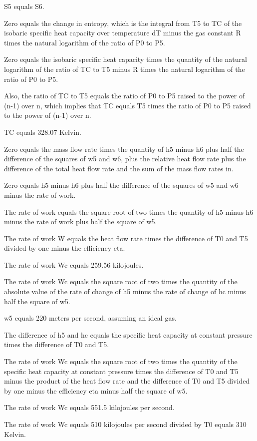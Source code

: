 S5 equals S6.

Zero equals the change in entropy, which is the integral from T5 to TC of the isobaric specific heat capacity over temperature dT minus the gas constant R times the natural logarithm of the ratio of P0 to P5.

Zero equals the isobaric specific heat capacity times the quantity of the natural logarithm of the ratio of TC to T5 minus R times the natural logarithm of the ratio of P0 to P5.

Also, the ratio of TC to T5 equals the ratio of P0 to P5 raised to the power of (n-1) over n, which implies that TC equals T5 times the ratio of P0 to P5 raised to the power of (n-1) over n.

TC equals 328.07 Kelvin.

Zero equals the mass flow rate times the quantity of h5 minus h6 plus half the difference of the squares of w5 and w6, plus the relative heat flow rate plus the difference of the total heat flow rate and the sum of the mass flow rates in.

Zero equals h5 minus h6 plus half the difference of the squares of w5 and w6 minus the rate of work.

The rate of work equals the square root of two times the quantity of h5 minus h6 minus the rate of work plus half the square of w5.

The rate of work W equals the heat flow rate times the difference of T0 and T5 divided by one minus the efficiency eta.

The rate of work Wc equals 259.56 kilojoules.

The rate of work Wc equals the square root of two times the quantity of the absolute value of the rate of change of h5 minus the rate of change of hc minus half the square of w5.

w5 equals 220 meters per second, assuming an ideal gas.

The difference of h5 and hc equals the specific heat capacity at constant pressure times the difference of T0 and T5.

The rate of work Wc equals the square root of two times the quantity of the specific heat capacity at constant pressure times the difference of T0 and T5 minus the product of the heat flow rate and the difference of T0 and T5 divided by one minus the efficiency eta minus half the square of w5.

The rate of work Wc equals 551.5 kilojoules per second.

The rate of work Wc equals 510 kilojoules per second divided by T0 equals 310 Kelvin.

